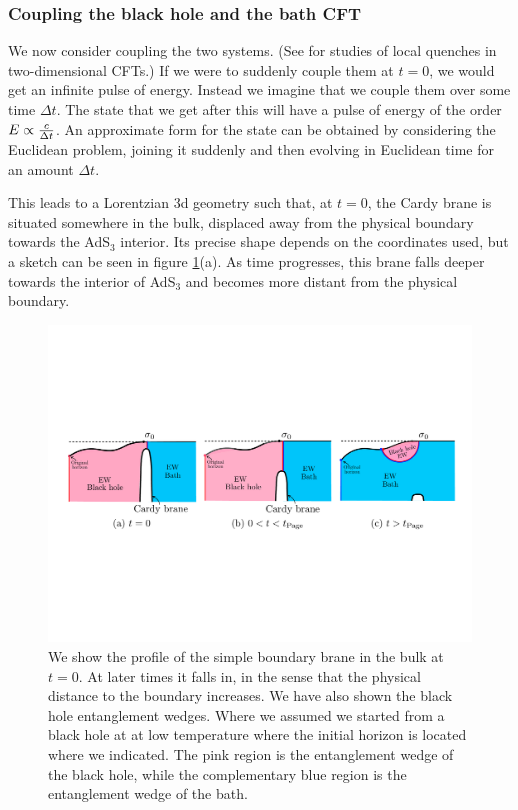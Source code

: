 \documentclass[12pt]{article}
\begin{document}
\subsubsection{Coupling the black hole and the bath CFT} 
 
We now consider coupling the two systems.
(See \cite{Anous:2016kss, Calabrese:2007mtj, Calabrese:2009qy, Asplund:2013zba, Caputa:2019avh, Shimaji:2018czt} for studies of local quenches in two-dimensional CFTs.)
If we were to suddenly couple them at $t=0$, we would get an infinite pulse of energy.
Instead we imagine that we couple them over some time $\Delta t$. 
The state that we get after this will have a pulse of energy of the order $E \propto { c \over \Delta t}$. 
An approximate form for the state can be obtained by considering the Euclidean problem, joining it suddenly and then evolving in Euclidean time for an amount $\Delta t$. 

This leads to a Lorentzian 3d geometry such that, at $t=0$, the Cardy brane is situated somewhere in the bulk, displaced away from the physical boundary towards the AdS$_3$ interior. 
Its precise shape depends on the coordinates used, but a sketch can be seen in figure \ref{EarlyEW}(a). 
As time progresses, this brane falls deeper towards the interior of  AdS$_3$ and becomes more distant from the physical boundary.

\begin{figure}[ht]
    \begin{center}
    \includegraphics[scale=.48]{Figures/EarlyEW}
    \end{center}
    \caption{We show the profile of the simple boundary brane in the bulk at $t=0$. 
    At later times it falls in, in the sense that the physical distance to the boundary increases. 
    We have also shown the black hole entanglement wedges. 
    Where we assumed we started from a black hole at at low temperature where the initial horizon is located where we indicated. The pink region is the entanglement wedge of the black hole, while the complementary blue region is the entanglement wedge of the bath.}
    \label{EarlyEW}
\end{figure}
\end{document}
